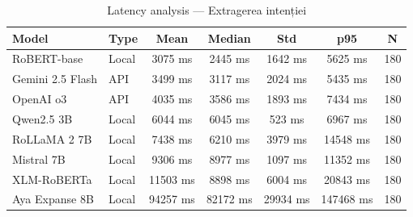 \begin{table}[H]
\centering
\footnotesize
\caption{Latency analysis — Extragerea intenției}
\label{tab:latency-intent-extraction}
\begin{tabular}{llccccc}
\toprule
\textbf{Model} & \textbf{Type} & \textbf{Mean} & \textbf{Median} & \textbf{Std} & \textbf{p95} & \textbf{N} \\
\midrule
RoBERT-base & Local & 3075 ms & 2445 ms & 1642 ms & 5625 ms & 180 \\
Gemini 2.5 Flash & API & 3499 ms & 3117 ms & 2024 ms & 5435 ms & 180 \\
OpenAI o3 & API & 4035 ms & 3586 ms & 1893 ms & 7434 ms & 180 \\
Qwen2.5 3B & Local & 6044 ms & 6045 ms & 523 ms & 6967 ms & 180 \\
RoLLaMA 2 7B & Local & 7438 ms & 6210 ms & 3979 ms & 14548 ms & 180 \\
Mistral 7B & Local & 9306 ms & 8977 ms & 1097 ms & 11352 ms & 180 \\
XLM-RoBERTa & Local & 11503 ms & 8898 ms & 6004 ms & 20843 ms & 180 \\
Aya Expanse 8B & Local & 94257 ms & 82172 ms & 29934 ms & 147468 ms & 180 \\
\bottomrule
\end{tabular}
\end{table}